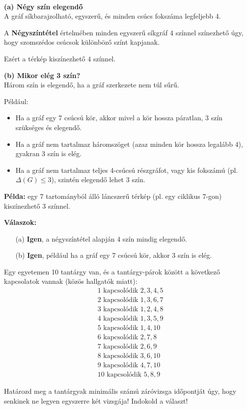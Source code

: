 \begin{solution}
	~
	
	\textbf{(a) Négy szín elegendő}\\
	A gráf síkbarajzolható, egyszerű, és minden csúcs fokszáma legfeljebb
	4.
	
	A \textbf{Négyszíntétel} értelmében minden egyszerű síkgráf 4 színnel
	színezhető úgy, hogy szomszédos csúcsok különböző színt kapjanak.
	
	Ezért a térkép kiszínezhető $\boxed{4}$ színnel.
	
	\textbf{(b) Mikor elég 3 szín?}\\
	Három szín is elegendő, ha a gráf szerkezete nem túl sűrű.
	
	Például: 
	\begin{itemize}
		\item Ha a gráf egy 7 csúcsú kör, akkor mivel a kör hossza páratlan, 3 szín
		szükséges és elegendő. 
		\item Ha a gráf nem tartalmaz háromszöget (azaz minden kör hossza legalább
		4), gyakran 3 szín is elég. 
		\item Ha a gráf nem tartalmaz teljes 4-csúcsú részgráfot, vagy kis fokszámú
		(pl. $\Delta(G)\leq3$), szintén elegendő lehet 3 szín. 
	\end{itemize}
	\textbf{Példa:} egy 7 tartományból álló láncszerű térkép (pl. egy
	ciklikus 7-gon) kiszínezhető 3 színnel.
	
	\textbf{Válaszok:}
	\begin{itemize}
		\item[(a)] \textbf{Igen}, a négyszíntétel alapján $\boxed{4}$ szín mindig elegendő. 
		\item[(b)] \textbf{Igen}, például ha a gráf egy 7 csúcsú kör, akkor $\boxed{3}$
		szín is elég. 
	\end{itemize}
\end{solution}
\begin{extraproblem}
Egy egyetemen 10 tantárgy van, és a tantárgy-párok között a következő
kapcsolatok vannak (közös hallgatók miatt):
\[
\begin{aligned} & 1\text{ kapcsolódik }2,3,4,5\\
	& 2\text{ kapcsolódik }1,3,6,7\\
	& 3\text{ kapcsolódik }1,2,4,8\\
	& 4\text{ kapcsolódik }1,3,5,9\\
	& 5\text{ kapcsolódik }1,4,10\\
	& 6\text{ kapcsolódik }2,7,8\\
	& 7\text{ kapcsolódik }2,6,9\\
	& 8\text{ kapcsolódik }3,6,10\\
	& 9\text{ kapcsolódik }4,7,10\\
	& 10\text{ kapcsolódik }5,8,9
\end{aligned}
\]

Határozd meg a tantárgyak minimális számú záróvizsga időpontját úgy,
hogy senkinek ne legyen egyszerre két vizsgája! Indokold a választ! 
\end{extraproblem}

